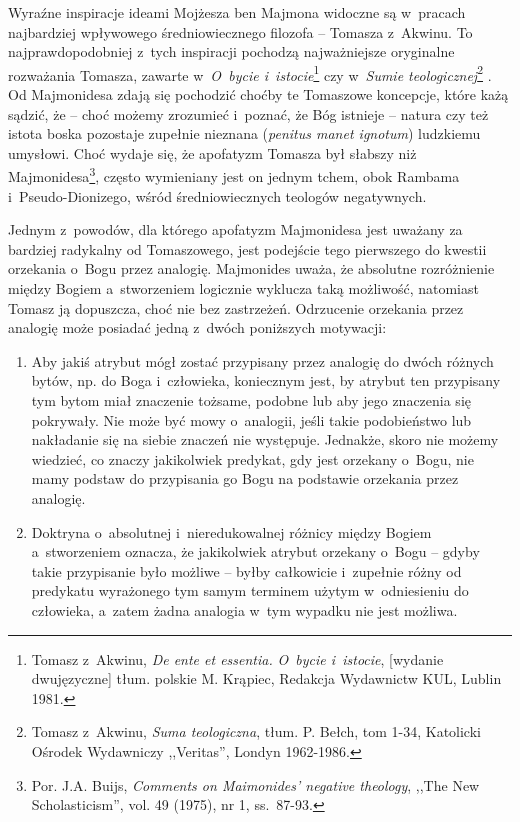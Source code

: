 Wyraźne inspiracje ideami Mojżesza ben Majmona widoczne są w~pracach najbardziej wpływowego średniowiecznego filozofa -- Tomasza z~Akwinu. To najprawdopodobniej z~tych inspiracji pochodzą najważniejsze oryginalne rozważania Tomasza, zawarte w~\textit{O~bycie i~istocie}\footnote{Tomasz z~Akwinu, \textit{De ente et essentia.} \textit{O~bycie i~istocie}, [wydanie dwujęzyczne] tłum. polskie M. Krąpiec, Redakcja Wydawnictw KUL, Lublin 1981.}
czy w~\textit{Sumie teologicznej}\footnote{Tomasz z~Akwinu, \textit{Suma teologiczna}, tłum. P. Bełch, tom 1-34, Katolicki Ośrodek Wydawniczy ,,Veritas'', Londyn 1962-1986.}
. Od Majmonidesa zdają się pochodzić choćby te Tomaszowe koncepcje, które każą sądzić, że -- choć możemy zrozumieć i~poznać, że Bóg istnieje -- natura czy też istota boska pozostaje zupełnie nieznana (\textit{penitus manet ignotum}) ludzkiemu umysłowi. Choć wydaje się, że apofatyzm Tomasza był słabszy niż Majmonidesa\footnote{Por. J.A. Buijs, \textit{Comments on Maimonides' negative theology}, ,,The New Scholasticism'', vol. 49 (1975), nr 1, ss.~87-93.}, często wymieniany jest on jednym tchem, obok Rambama i~Pseudo-Dionizego, wśród średniowiecznych teologów negatywnych.

Jednym z~powodów, dla którego apofatyzm Majmonidesa jest uważany za bardziej radykalny od Tomaszowego, jest podejście tego pierwszego do kwestii orzekania o~Bogu przez analogię. Majmonides uważa, że absolutne rozróżnienie między Bogiem a~stworzeniem logicznie wyklucza taką możliwość, natomiast Tomasz ją dopuszcza, choć nie bez zastrzeżeń. Odrzucenie orzekania przez analogię może posiadać jedną z~dwóch poniższych motywacji:
\begin{enumerate}[label = (\arabic*)]
\item Aby jakiś atrybut mógł zostać przypisany przez analogię do dwóch różnych bytów, np. do Boga i~człowieka, koniecznym jest, by atrybut ten przypisany tym bytom miał znaczenie tożsame, podobne lub aby jego znaczenia się pokrywały. Nie może być mowy o~analogii, jeśli takie podobieństwo lub nakładanie się na siebie znaczeń nie występuje. Jednakże, skoro nie możemy wiedzieć, co znaczy jakikolwiek predykat, gdy jest orzekany o~Bogu, nie mamy podstaw do przypisania go Bogu na podstawie orzekania przez analogię.

\item Doktryna o~absolutnej i~nieredukowalnej różnicy między Bogiem a~stworzeniem oznacza, że jakikolwiek atrybut orzekany o~Bogu -- gdyby takie przypisanie było możliwe -- byłby całkowicie i~zupełnie różny od predykatu wyrażonego tym samym terminem użytym w~odniesieniu do człowieka, a~zatem żadna analogia w~tym wypadku nie jest możliwa.
\end{enumerate}

